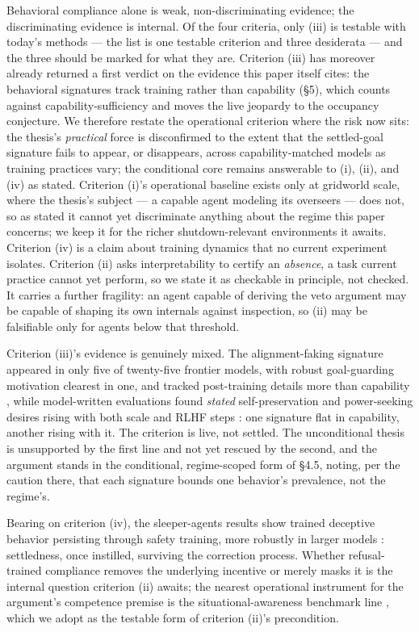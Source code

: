 \documentclass[11pt]{article}
\theoremstyle{definition}
\begin{document}
Behavioral compliance alone is weak, non-discriminating evidence; the discriminating evidence is internal. Of the four criteria, only (iii) is testable with today's methods --- the list is one testable criterion and three desiderata --- and the three should be marked for what they are. Criterion (iii) has moreover already returned a first verdict on the evidence this paper itself cites: the behavioral signatures track training rather than capability (\S5), which counts against capability-sufficiency and moves the live jeopardy to the occupancy conjecture. We therefore restate the operational criterion where the risk now sits: the thesis's \emph{practical} force is disconfirmed to the extent that the settled-goal signature fails to appear, or disappears, across capability-matched models as training practices vary; the conditional core remains answerable to (i), (ii), and (iv) as stated. Criterion (i)'s operational baseline exists only at gridworld scale, where the thesis's subject --- a capable agent modeling its overseers --- does not, so as stated it cannot yet discriminate anything about the regime this paper concerns; we keep it for the richer shutdown-relevant environments it awaits. Criterion (iv) is a claim about training dynamics that no current experiment isolates. Criterion (ii) asks interpretability to certify an \emph{absence}, a task current practice cannot yet perform, so we state it as checkable in principle, not checked. It carries a further fragility: an agent capable of deriving the veto argument may be capable of shaping its own internals against inspection, so (ii) may be falsifiable only for agents below that threshold.

Criterion (iii)'s evidence is genuinely mixed. The alignment-faking signature appeared in only five of twenty-five frontier models, with robust goal-guarding motivation clearest in one, and tracked post-training details more than capability \cite{sheshadri2025alignment}, while model-written evaluations found \emph{stated} self-preservation and power-seeking desires rising with both scale and RLHF steps \cite{perez2022discovering}: one signature flat in capability, another rising with it. The criterion is live, not settled. The unconditional thesis is unsupported by the first line and not yet rescued by the second, and the argument stands in the conditional, regime-scoped form of \S4.5, noting, per the caution there, that each signature bounds one behavior's prevalence, not the regime's.

Bearing on criterion (iv), the sleeper-agents results show trained deceptive behavior persisting through safety training, more robustly in larger models \cite{hubinger2024sleeper}: settledness, once instilled, surviving the correction process. Whether refusal-trained compliance removes the underlying incentive or merely masks it is the internal question criterion (ii) awaits; the nearest operational instrument for the argument's competence premise is the situational-awareness benchmark line \cite{laine2024sad}, which we adopt as the testable form of criterion (ii)'s precondition.
\end{document}
